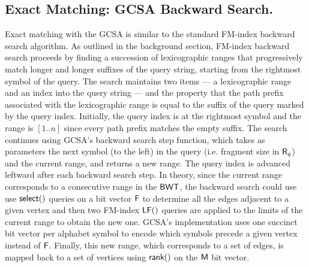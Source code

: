 

 


\subsection{Exact Matching: GCSA Backward Search.}


Exact matching with the GCSA is similar to the standard FM-index backward search algorithm. As outlined in the background section, FM-index backward search proceeds by finding a succession of lexicographic ranges that progressively match longer and longer suffixes of the query string, starting from the rightmost symbol of the query. The search maintains two items --- a lexicographic range and an index into the query string --- and the property that the path prefix associated with the lexicographic range is equal to the suffix of the query marked by the query index. Initially, the query index is at the rightmost symbol and the range is $[1..n]$ since every path prefix matches the empty suffix.  The search continues using GCSA's backward search step function, which takes as parameters the next symbol (to the left) in the query (i.e. fragment size in $\mbox{\rm {\sf R}}_q$) and the current range, and returns a new range.  The query index is advanced leftward after each backward search step.  In theory, since the current range corresponds to a consecutive range in the $\mbox{\rm {\sf BWT}}$, the backward search could use use $\textsf{select}()$ queries on a bit vector $\mbox{\rm {\sf F}}$ to determine all the edges adjacent to a given vertex and then two FM-index $\mbox{\rm {\sf LF}}()$ queries are applied to the limits of the current range to obtain the new one.  GCSA's implementation uses one succinct bit vector per alphabet symbol to encode which symbols precede a given vertex instead of $\mbox{\rm {\sf F}}$.  Finally, this new range, which corresponds to a set of edges, is mapped back to a set of vertices using $\textsf{rank}()$ on the $\mbox{\rm {\sf M}}$ bit vector.


